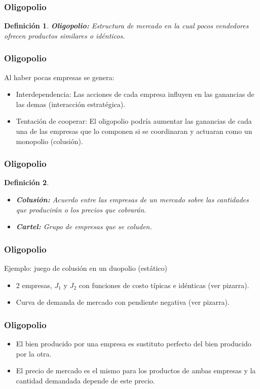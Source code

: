 \documentclass[dvipsnames,table,leqno]{beamer}
\newtheorem{mydef}{Definición}
\newcommand{\peq}[1]{{\scriptscriptstyle{#1}}}
\begin{document}
		\begin{frame}
			\frametitle{Oligopolio}
			\begin{mydef}
				\textbf{Oligopolio:} Estructura de mercado en la cual pocos vendedores ofrecen productos similares o idénticos.
			\end{mydef}
		\end{frame}		
	
		\begin{frame}
			\frametitle{Oligopolio}
			Al haber pocas empresas se genera:
			\begin{itemize}
				\item Interdependencia: Las acciones de cada empresa influyen en las ganancias de las demas (interacción estratégica).
				\item Tentación de cooperar: El oligopolio podría aumentar las ganancias de cada una de las empresas que lo componen si se coordinaran y actuaran como un monopolio (colusión).
			\end{itemize}
		\end{frame}	
	
		\begin{frame}
			\frametitle{Oligopolio}
			\begin{mydef}
				\begin{itemize}
					\item \textbf{Colusión:} Acuerdo entre las empresas de un mercado sobre las cantidades que producirán o los precios que cobrarán.
					\item \textbf{Cartel:} Grupo de empresas que se coluden.
				\end{itemize}
			\end{mydef}
		\end{frame}			

		\begin{frame}
			\frametitle{Oligopolio}
			Ejemplo: juego de colusión en un duopolio (estático)
			\begin{itemize}
				\item 2 empresas, $J_\peq{1}$ y $J_\peq{2}$ con funciones de costo típicas e idénticas (ver pizarra).
				\item Curva de demanda de mercado con pendiente negativa (ver pizarra).
			\end{itemize}
		\end{frame}			

		\begin{frame}
			\frametitle{Oligopolio}
			\begin{itemize}
				\item El bien producido por una empresa es sustituto perfecto del bien producido por la otra.
				\item El precio de mercado es el mismo para los productos de ambas empresas y la cantidad demandada depende de este precio.
			\end{itemize}
		\end{frame}			
\end{document}
